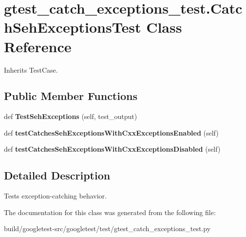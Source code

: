 \hypertarget{classgtest__catch__exceptions__test_1_1CatchSehExceptionsTest}{}\section{gtest\+\_\+catch\+\_\+exceptions\+\_\+test.\+Catch\+Seh\+Exceptions\+Test Class Reference}
\label{classgtest__catch__exceptions__test_1_1CatchSehExceptionsTest}


Inherits Test\+Case.

\subsection*{Public Member Functions}
\begin{DoxyCompactItemize}
\item 
\mbox{\label{classgtest__catch__exceptions__test_1_1CatchSehExceptionsTest_a737bbcc64405854aa8e0aea87ca5850b}} 
def {\bfseries Test\+Seh\+Exceptions} (self, test\+\_\+output)
\item 
\mbox{\label{classgtest__catch__exceptions__test_1_1CatchSehExceptionsTest_a02d06790fb52416a9da6a28b624e9cd9}} 
def {\bfseries test\+Catches\+Seh\+Exceptions\+With\+Cxx\+Exceptions\+Enabled} (self)
\item 
\mbox{\label{classgtest__catch__exceptions__test_1_1CatchSehExceptionsTest_a4a181de9de2b147eff55ed7a1d7d40c4}} 
def {\bfseries test\+Catches\+Seh\+Exceptions\+With\+Cxx\+Exceptions\+Disabled} (self)
\end{DoxyCompactItemize}


\subsection{Detailed Description}
\begin{DoxyVerb}Tests exception-catching behavior.\end{DoxyVerb}
 

The documentation for this class was generated from the following file\+:\begin{DoxyCompactItemize}
\item 
build/googletest-\/src/googletest/test/gtest\+\_\+catch\+\_\+exceptions\+\_\+test.\+py\end{DoxyCompactItemize}
